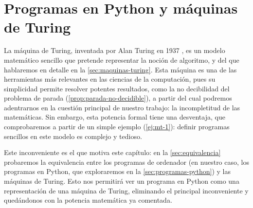 

\chapter{Programas en Python y máquinas de Turing}\label{ch:programas-python-maquinas-turing}

La máquina de Turing, inventada por Alan Turing en 1937 \cite{Turing1937}, es un modelo matemático sencillo que pretende representar la noción de algoritmo, y del que hablaremos en detalle en la \cref{sec:maquinas-turing}. Esta máquina es una de las herramientas más relevantes en las ciencias de la computación, pues su simplicidad permite resolver potentes resultados, como la no decibilidad del problema de parada (\cref{prop:parada-no-decidible}), a partir del cual podremos adentrarnos en la cuestión principal de nuestro trabajo: la incompletitud de las matemáticas. Sin embargo, esta potencia formal tiene una desventaja, que comprobaremos a partir de un simple ejemplo (\cref{ej:mt-1}): definir programas sencillos en este modelo es complejo y tedioso.

Este inconveniente es el que motiva este capítulo: en la \cref{sec:equivalencia} probaremos la equivalencia entre los programas de ordenador (en nuestro caso, los programas en Python, que exploraremos en la \cref{sec:programas-python}) y las máquinas de Turing. Esto nos permitirá ver un programa en Python como una representación de una máquina de Turing, eliminando el principal inconveniente y quedándonos con la potencia matemática ya comentada.

